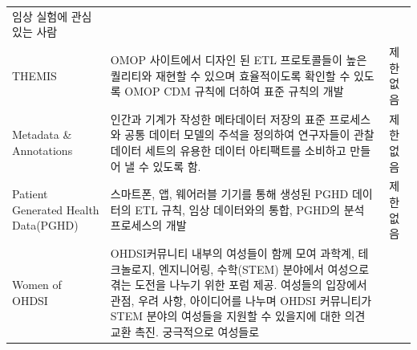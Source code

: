\documentclass[11pt]{book}
\theoremstyle{definition}
\theoremstyle{definition}
\theoremstyle{definition}
\theoremstyle{remark}
\begin{document}
\begin{longtable}[]{@{}lll@{}}
\begin{minipage}[t]{0.37\columnwidth}
임상 실험에 관심 있는 사람\strut
\end{minipage}\tabularnewline
\begin{minipage}[t]{0.11\columnwidth}\raggedright\strut
THEMIS\strut
\end{minipage} & \begin{minipage}[t]{0.44\columnwidth}\raggedright\strut
OMOP 사이트에서 디자인 된 ETL 프로토콜들이 높은 퀄리티와 재현할 수
있으며 효율적이도록 확인할 수 있도록 OMOP CDM 규칙에 더하여 표준 규칙의
개발\strut
\end{minipage} & \begin{minipage}[t]{0.37\columnwidth}\raggedright\strut
제한 없음\strut
\end{minipage}\tabularnewline
\begin{minipage}[t]{0.11\columnwidth}\raggedright\strut
Metadata \& Annotations\strut
\end{minipage} & \begin{minipage}[t]{0.44\columnwidth}\raggedright\strut
인간과 기계가 작성한 메타데이터 저장의 표준 프로세스와 공통 데이터
모델의 주석을 정의하여 연구자들이 관찰 데이터 세트의 유용한 데이터
아티팩트를 소비하고 만들어 낼 수 있도록 함.\strut
\end{minipage} & \begin{minipage}[t]{0.37\columnwidth}\raggedright\strut
제한 없음\strut
\end{minipage}\tabularnewline
\begin{minipage}[t]{0.11\columnwidth}\raggedright\strut
Patient Generated Health Data(PGHD)\strut
\end{minipage} & \begin{minipage}[t]{0.44\columnwidth}\raggedright\strut
스마트폰, 앱, 웨어러블 기기를 통해 생성된 PGHD 데이터의 ETL 규칙, 임상
데이터와의 통합, PGHD의 분석 프로세스의 개발\strut
\end{minipage} & \begin{minipage}[t]{0.37\columnwidth}\raggedright\strut
제한 없음\strut
\end{minipage}\tabularnewline
\begin{minipage}[t]{0.11\columnwidth}\raggedright\strut
Women of OHDSI\strut
\end{minipage} & \begin{minipage}[t]{0.44\columnwidth}\raggedright\strut
OHDSI커뮤니티 내부의 여성들이 함께 모여 과학계, 테크놀로지, 엔지니어링,
수학(STEM) 분야에서 여성으로 겪는 도전을 나누기 위한 포럼 제공. 여성들의
입장에서 관점, 우려 사항, 아이디어를 나누며 OHDSI 커뮤니티가 STEM 분야의
여성들을 지원할 수 있을지에 대한 의견 교환 촉진. 궁극적으로 여성들로

\end{minipage}
\end{longtable}
\end{document}
